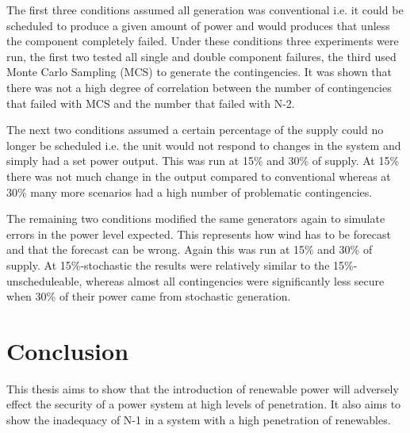 \documentclass[a4paper,oneside,12pt]{report}
\begin{document}
The first three conditions assumed all generation was conventional i.e. it could be scheduled to produce a given amount of power and would produces that unless the component completely failed. Under these conditions three experiments were run, the first two tested all single and double component failures, the third used Monte Carlo Sampling (MCS) to generate the contingencies. It was shown that there was not a high degree of correlation between the number of contingencies that failed with MCS and the number that failed with N-2. 

The next two conditions assumed a certain percentage of the supply could no longer be scheduled i.e. the unit would not respond to changes in the system and simply had a set power output. This was run at 15\% and 30\% of supply. At 15\% there was not much change in the output compared to conventional whereas at 30\% many more scenarios had a high number of problematic contingencies.

The remaining two conditions modified the same generators again to simulate errors in the power level expected. This represents how wind has to be forecast and that the forecast can be wrong. Again this was run at 15\% and 30\% of supply. At 15\%-stochastic the results were relatively similar to the 15\%-unscheduleable, whereas almost all contingencies were significantly less secure when 30\% of their power came from stochastic generation.












\chapter{Conclusion}

This thesis aims to show that the introduction of renewable power will adversely effect the security of a power system at high levels of penetration. It also aims to show the inadequacy of N-1 in a system with a high penetration of renewables. 
\end{document}
